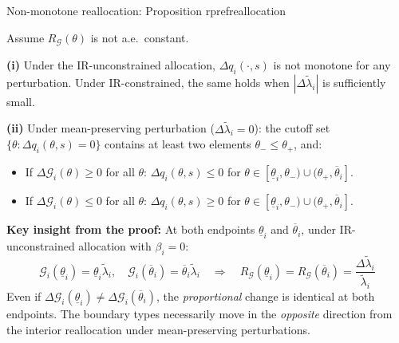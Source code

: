\documentclass[10pt, aspectratio=169]{beamer}
\newcommand{\G}{\mathcal{G}}
\begin{document}
\begin{frame}{Non-monotone reallocation: Proposition rprefreallocation}
\begin{lemma}
Assume $R_\G(\theta)$ is not a.e.\ constant.

\textbf{(i)} Under the IR-unconstrained allocation, $\Delta q_i(\cdot,s)$ is not monotone for any perturbation. Under IR-constrained, the same holds when $|\Delta\tilde\lambda_i|$ is sufficiently small.

\textbf{(ii)} Under mean-preserving perturbation ($\Delta\tilde\lambda_i = 0$): the cutoff set $\{\theta : \Delta q_i(\theta,s)=0\}$ contains at least two elements $\theta_- \leq \theta_+$, and:
\begin{itemize}
\item If $\Delta\G_i(\theta) \geq 0$ for all $\theta$: $\Delta q_i(\theta,s) \leq 0$ for $\theta \in [\underline\theta_i, \theta_-) \cup (\theta_+, \overline\theta_i]$.
\item If $\Delta\G_i(\theta) \leq 0$ for all $\theta$: $\Delta q_i(\theta,s) \geq 0$ for $\theta \in [\underline\theta_i, \theta_-) \cup (\theta_+, \overline\theta_i]$.
\end{itemize}
\end{lemma}
\vspace{0.2cm}
\textbf{Key insight from the proof:} At both endpoints $\underline\theta_i$ and $\overline\theta_i$, under IR-unconstrained allocation with $\beta_i = 0$:
\[ \G_i(\underline\theta_i) = \underline\theta_i\tilde\lambda_i, \quad \G_i(\overline\theta_i) = \overline\theta_i\tilde\lambda_i \quad \Rightarrow \quad R_\G(\underline\theta_i) = R_\G(\overline\theta_i) = \frac{\Delta\tilde\lambda_i}{\tilde\lambda_i} \]
Even if $\Delta\G_i(\underline\theta_i) \neq \Delta\G_i(\overline\theta_i)$, the \emph{proportional} change is identical at both endpoints. The boundary types necessarily move in the \emph{opposite} direction from the interior reallocation under mean-preserving perturbations.
\end{frame}
\end{document}
